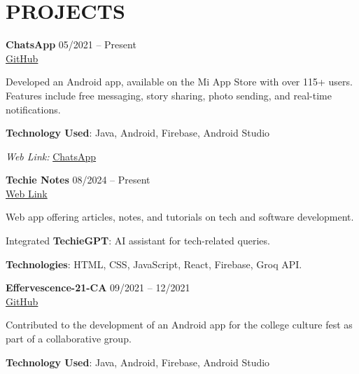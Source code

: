 \documentclass[10pt, letterpaper]{article}
\begin{document}
\section{PROJECTS}

\textbf{ChatsApp} \hfill 05/2021 -- Present \\
\href{https://github.com/jnvshubham7/ChatsApp}{GitHub} \\
\begin{highlightsforbulletentries}
    \item Developed an Android app, available on the Mi App Store with over 115+ users. Features include free messaging, story sharing, photo sending, and real-time notifications.
    \item \textbf{Technology Used}: Java, Android, Firebase, Android Studio
    \item \textit{Web Link:} \href{https://global.app.mi.com/details?lo=IN&la=en_US&id=com.example.chatsapp}{ChatsApp}
\end{highlightsforbulletentries}

\vspace{1em}

\textbf{Techie Notes} \hfill 08/2024 -- Present \\
\href{https://techienotes.vercel.app}{Web Link} \\
\begin{highlightsforbulletentries}
    \item Web app offering articles, notes, and tutorials on tech and software development.
    \item Integrated \textbf{TechieGPT}: AI assistant for tech-related queries.
    \item \textbf{Technologies}: HTML, CSS, JavaScript, React, Firebase, Groq API.
\end{highlightsforbulletentries}

\vspace{1em}

\textbf{Effervescence-21-CA} \hfill 09/2021 -- 12/2021 \\
\href{https://github.com/jnvshubham7/Effervescence_21_CA}{GitHub} \\
\begin{highlightsforbulletentries}
    \item Contributed to the development of an Android app for the college culture fest as part of a collaborative group.
    \item \textbf{Technology Used}: Java, Android, Firebase, Android Studio
\end{highlightsforbulletentries}
\end{document}
